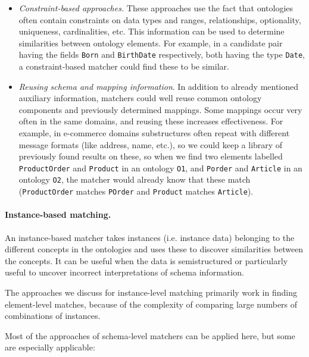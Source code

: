 \begin{itemize}
\item \textit{Constraint-based approaches.} These approaches use the
fact that ontologies often contain constraints on data types and
ranges, relationships, optionality, uniqueness, cardinalities, etc.
This information can be used to determine similarities between ontology
elements. For example, in a candidate pair having the fields
\texttt{Born} and \texttt{BirthDate}
respectively, both having the type \texttt{Date}, a
constraint-based matcher could find these to be similar. 
\end{itemize}
\begin{itemize}
\item \textit{Reusing schema and mapping information}. In addition to
already mentioned auxiliary information, matchers could well reuse
common ontology components and previously determined mappings. Some
mappings occur very often in the same domains, and reusing these
increases effectiveness. For example, in e-commerce domains
substructures often repeat with different message formats (like
address, name, etc.), so we could keep a library of previously found
results on these, so when we find two elements labelled
\texttt{ProductOrder} and \texttt{Product} in
an ontology \texttt{O1}, and \texttt{Porder}
and \texttt{Article} in an ontology
\texttt{O2}, the matcher would already know that these
match (\texttt{ProductOrder} matches
\texttt{POrder} and \texttt{Product} matches
\texttt{Article}). 
\end{itemize}

\paragraph{Instance-based matching.}
An instance-based matcher \cite{rahm01survey} takes instances
(i.e. instance data) belonging to the different concepts in the
ontologies and uses these to discover similarities between the
concepts. It can be useful when the data is semistructured or
particularly useful to uncover incorrect interpretations of schema
information. 

The approaches we discuss for instance-level matching primarily work in
finding element-level matches, because of the complexity of comparing
large numbers of combinations of instances. 

Most of the approaches of schema-level matchers can be applied here, but
some are especially applicable: 

